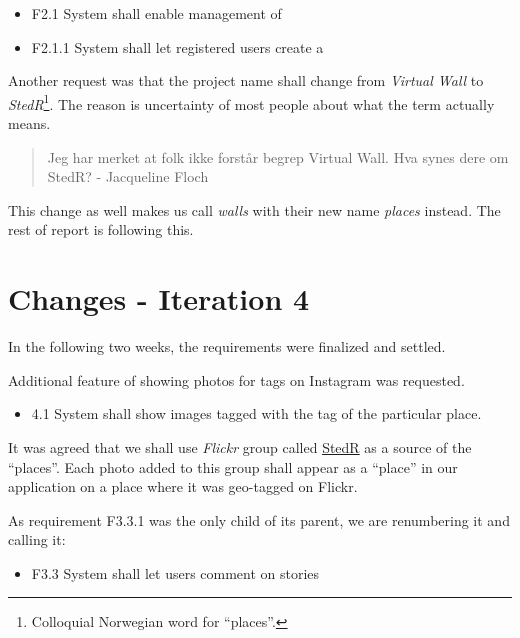 \documentclass[11pt]{book}
\begin{document}
\begin{itemize}
  \item F2.1 System shall enable management of \wallentityp
  \item F2.1.1 System shall let registered users create a \wallentitys
\end{itemize}

Another request was that the project name shall change from
\emph{Virtual Wall} to \emph{StedR}\footnote{Colloquial Norwegian word for ``places''.}. The reason is uncertainty of most people about what the
term actually means.

\begin{quote}
Jeg har merket at folk ikke forstår begrep Virtual Wall. Hva synes dere
om StedR? - Jacqueline Floch
\end{quote}

This change as well makes us call \emph{walls} with their new name
\emph{places} instead. The rest of report is following this. %

\section{Changes - Iteration 4}\label{changes---iteration-4}

In the following two weeks, the requirements were finalized and settled.

Additional feature of showing photos for tags on Instagram was
requested.

\begin{itemize}
  \item 4.1 System shall show images tagged with the tag of the particular
  place.
\end{itemize}

It was agreed that we shall use \emph{Flickr} group called
\href{http://www.flickr.com/groups/2297124@N25/}{StedR} as a source of
the ``places''. Each photo added to this group shall appear as a
``place'' in our application on a place where it was geo-tagged on
Flickr.

As requirement F3.3.1 was the only child of its parent, we are
renumbering it and calling it:

\begin{itemize}
  \item F3.3 System shall let users comment on stories
\end{itemize}
\end{document}
